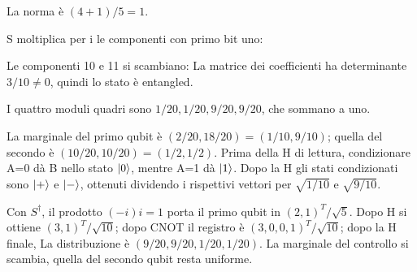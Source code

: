 \ExSolution


La norma è \((4+1)/5=1\).


S moltiplica per i le componenti con primo bit uno:


Le componenti 10 e 11 si scambiano:
La matrice dei coefficienti ha determinante \(3/10\ne0\), quindi lo stato è entangled.


I quattro moduli quadri sono \(1/20,1/20,9/20,9/20\), che sommano a uno.


La marginale del primo qubit è \((2/20,18/20)=(1/10,9/10)\); quella del secondo è \((10/20,10/20)=(1/2,1/2)\). Prima della H di lettura, condizionare A=0 dà B nello stato \(\lvert 0\rangle\), mentre A=1 dà \(\lvert 1\rangle\). Dopo la H gli stati condizionati sono \(\lvert +\rangle\) e \(\lvert -\rangle\), ottenuti dividendo i rispettivi vettori per \(\sqrt{1/10}\) e \(\sqrt{9/10}\).


Con \(S^\dagger\), il prodotto \((-i)i=1\) porta il primo qubit in \((2,1)^T/\sqrt5\). Dopo H si ottiene \((3,1)^T/\sqrt{10}\); dopo CNOT il registro è \((3,0,0,1)^T/\sqrt{10}\); dopo la H finale,
La distribuzione è \((9/20,9/20,1/20,1/20)\). La marginale del controllo si scambia, quella del secondo qubit resta uniforme.

